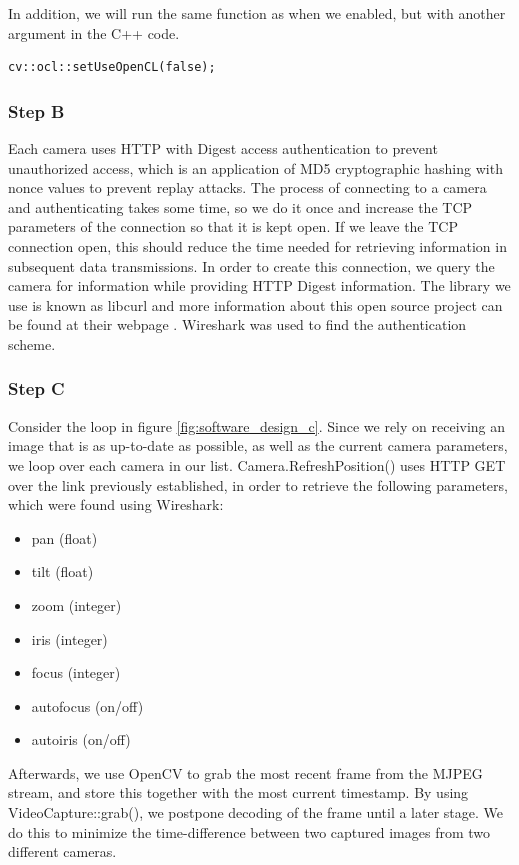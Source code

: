 In addition, we will run the same function as when we enabled, but with another argument in the C++ code.

\begin{lstlisting}[style=BashInputStyle]
	cv::ocl::setUseOpenCL(false);
\end{lstlisting}


\subsubsection{Step B}
Each camera uses HTTP with Digest access authentication to prevent unauthorized access, which is an application of MD5 cryptographic hashing with nonce values to prevent replay attacks. The process of connecting to a camera and authenticating takes some time, so we do it once and increase the TCP parameters of the connection so that it is kept open. If we leave the TCP connection open, this should reduce the time needed for retrieving information in subsequent data transmissions. In order to create this connection, we query the camera for information while providing HTTP Digest information. The library we use is known as libcurl and more information about this open source project can be found at their webpage \citet{curl15}. Wireshark was used to find the authentication scheme.
\subsubsection{Step C}
Consider the loop in figure \ref{fig:software_design_c}.
Since we rely on receiving an image that is as up-to-date as possible, as well as the current camera parameters, we loop over each camera in our list. Camera.RefreshPosition() uses HTTP GET over the link previously established, in order to retrieve the following parameters, which were found using Wireshark:

\begin{itemize}
\item pan (float)
\item tilt (float)
\item zoom (integer)
\item iris (integer)
\item focus (integer)
\item autofocus (on/off)
\item autoiris (on/off)
\end{itemize}

Afterwards, we use OpenCV to grab the most recent frame from the MJPEG stream, and store this together with the most current timestamp. By using VideoCapture::grab(), we postpone decoding of the frame until a later stage. We do this to minimize the time-difference between two captured images from two different cameras.

